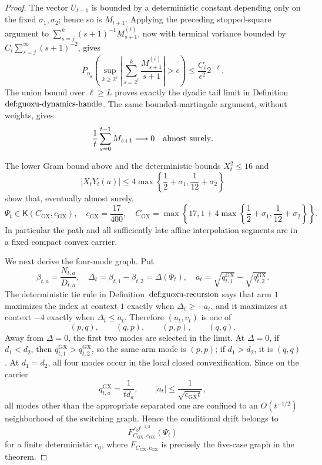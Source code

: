 \documentclass{article}
\begin{document}
\begin{proof}
The vector \(U_{t+1}\) is bounded by a deterministic constant depending only on the fixed \(\sigma_1,\sigma_2\); hence so is \(M_{t+1}\).  Applying the preceding stopped-square argument to \(\sum_{s=j}^k(s+1)^{-1}M_{s+1}^{(i)}\), now with terminal variance bounded by \(C_i\sum_{s=j}^{\infty}(s+1)^{-2}\), gives
\[
 P_{\eta_0}\!\left(
 \sup_{k\ge 2^\ell}
 \left|\sum_{s=2^\ell}^{k}\frac{M_{s+1}^{(i)}}{s+1}\right|>\epsilon
 \right)
 \le \frac{C_i}{\epsilon^2}2^{-\ell}.
\]
The union bound over \(\ell\ge L\) proves exactly the dyadic tail limit in Definition~\(\textnormal{def:guoxu-dynamics-handle}\).  The same bounded-martingale argument, without weights, gives
\[
 \frac1t\sum_{s=0}^{t-1}M_{s+1}\longrightarrow0
 \quad\hbox{almost surely}.
\]

The lower Gram bound above and the deterministic bounds \(X_t^2\le16\) and
\[
 |X_tY_t(a)|\le4\max\left\{\frac12+\sigma_1,\frac1{12}+\sigma_2\right\}
\]
show that, eventually almost surely,
\[
 \Psi_t\in\mathsf K(C_{\mathrm{GX}},c_{\mathrm{GX}}),
 \quad
 c_{\mathrm{GX}}=\frac{17}{400},
 \quad
 C_{\mathrm{GX}}=\max\left\{17,
 1+4\max\left\{\frac12+\sigma_1,\frac1{12}+\sigma_2\right\}\right\}.
\]
In particular the path and all sufficiently late affine interpolation segments are in a fixed compact convex carrier.

We next derive the four-mode graph.  Put
\[
 \beta_{t,a}=\frac{N_{t,a}}{D_{t,a}},
 \quad
 \Delta_t=\beta_{t,1}-\beta_{t,2}=\Delta(\Psi_t),
 \quad
 a_t=\sqrt{q^{\mathrm{GX}}_{t,1}}-\sqrt{q^{\mathrm{GX}}_{t,2}}.
\]
The deterministic tie rule in Definition~\(\textnormal{def:guoxu-recursion}\) says that arm \(1\) maximizes the index at context \(1\) exactly when \(\Delta_t\ge-a_t\), and it maximizes at context \(-4\) exactly when \(\Delta_t\le a_t\).  Therefore \((u_t,v_t)\) is one of
\[
 (p,q),\qquad(q,p),\qquad(p,p),\qquad(q,q).
\]
Away from \(\Delta=0\), the first two modes are selected in the limit.  At \(\Delta=0\), if \(d_1<d_2\), then \(q^{\mathrm{GX}}_{t,1}>q^{\mathrm{GX}}_{t,2}\), so the same-arm mode is \((p,p)\); if \(d_1>d_2\), it is \((q,q)\).  At \(d_1=d_2\), all four modes occur in the local closed convexification.  Since on the carrier
\[
 q^{\mathrm{GX}}_{t,a}=\frac1{td_a},
 \qquad
 |a_t|\le \frac1{\sqrt{c_{\mathrm{GX}}t}},
\]
all modes other than the appropriate separated one are confined to an \(O(t^{-1/2})\) neighborhood of the switching graph.  Hence the conditional drift belongs to
\[
 F_{C_{\mathrm{GX}},c_{\mathrm{GX}}}^{\,c_0t^{-1/2}}(\Psi_t)
\]
for a finite deterministic \(c_0\), where \(F_{C_{\mathrm{GX}},c_{\mathrm{GX}}}\) is precisely the five-case graph in the theorem.


\end{proof}
\end{document}
